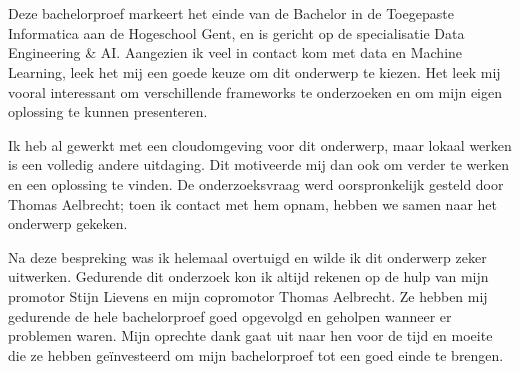 
\chapter*{}%
\label{ch:voorwoord}
Deze bachelorproef markeert het einde van de Bachelor in de Toegepaste Informatica aan de Hogeschool Gent, en is gericht op de specialisatie Data Engineering \& AI. Aangezien ik veel in contact kom met data en Machine Learning, leek het mij een goede keuze om dit onderwerp te kiezen. Het leek mij vooral interessant om verschillende frameworks te onderzoeken en om mijn eigen oplossing te kunnen presenteren.

Ik heb al gewerkt met een cloudomgeving voor dit onderwerp, maar lokaal werken is een volledig andere uitdaging. Dit motiveerde mij dan ook om verder te werken en een oplossing te vinden. De onderzoeksvraag werd oorspronkelijk gesteld door Thomas Aelbrecht; toen ik contact met hem opnam, hebben we samen naar het onderwerp gekeken.

Na deze bespreking was ik helemaal overtuigd en wilde ik dit onderwerp zeker uitwerken. Gedurende dit onderzoek kon ik altijd rekenen op de hulp van mijn promotor Stijn Lievens en mijn copromotor Thomas Aelbrecht. Ze hebben mij gedurende de hele bachelorproef goed opgevolgd en geholpen wanneer er problemen waren. Mijn oprechte dank gaat uit naar hen voor de tijd en moeite die ze hebben geïnvesteerd om mijn bachelorproef tot een goed einde te brengen.


